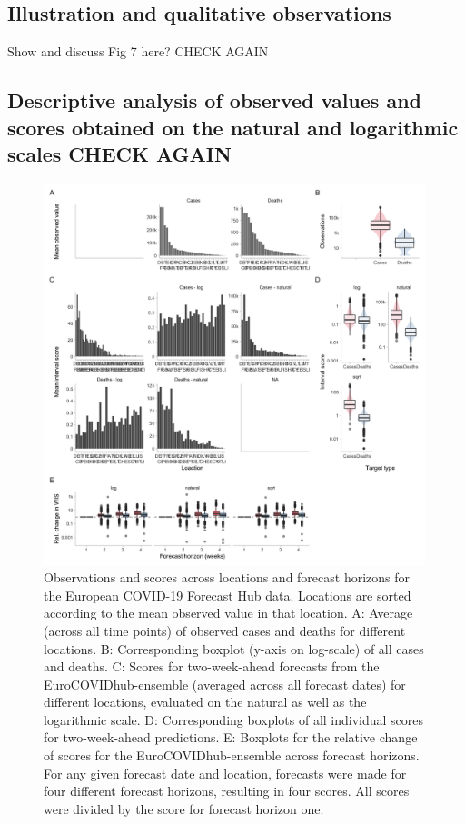\documentclass{article}
\begin{document}
\subsection{Illustration and qualitative observations}

Show and discuss Fig 7 here? CHECK AGAIN

\subsection{Descriptive analysis of observed values and scores obtained on the natural and logarithmic scales CHECK AGAIN} 

\begin{figure}[h!]
    \centering
    \includegraphics[width=0.99\textwidth]{output/figures/HUB-mean-obs-location.png}
    \caption{Observations and scores across locations and forecast horizons for the European COVID-19 Forecast Hub data. Locations are sorted according to the mean observed value in that location. 
    A: Average (across all time points) of observed cases and deaths for different locations. B: Corresponding boxplot (y-axis on log-scale) of all cases and deaths. C: Scores for two-week-ahead forecasts from the EuroCOVIDhub-ensemble (averaged across all forecast dates) for different locations, evaluated on the natural as well as the logarithmic scale. D: Corresponding boxplots of all individual scores for two-week-ahead predictions. E: Boxplots for the relative change of scores for the EuroCOVIDhub-ensemble across forecast horizons. For any given forecast date and location, forecasts were made for four different forecast horizons, resulting in four scores. All scores were divided by the score for forecast horizon one.}
    \label{fig:HUB-mean-locations}
\end{figure}
\end{document}
